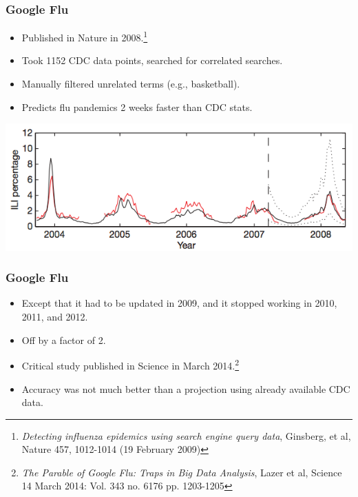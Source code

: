 \documentclass{beamer}
\begin{document}
\begin{frame}
\frametitle{Google Flu}
    \begin{itemize}
        \item Published in Nature in 2008.\footnote{
            \textit{Detecting influenza epidemics using search engine
            query data}, Ginsberg, et al, Nature 457, 1012-1014 (19 February
            2009)}
        \item<2-> Took 1152 CDC data points, searched for correlated searches.
        \item<3-> Manually filtered unrelated terms (e.g., basketball).
        \item<4-> Predicts flu pandemics 2 weeks faster than CDC stats.
    \end{itemize}
    \begin{center}
        \includegraphics[width=0.8\hsize]{art/googleflugraph}
    \end{center}
\end{frame}


\begin{frame}
    \frametitle{Google Flu}
    \begin{itemize}
        \item Except that it had to be updated in 2009, and it stopped working in 2010, 2011, and 2012.
        \item Off by a factor of 2.
        \item<2->Critical study published in Science in March 2014.\footnote{\textit{The Parable of Google 
            Flu: Traps in Big Data Analysis}, Lazer et al, Science 14 March
            2014: Vol. 343 no. 6176 pp. 1203-1205}
        \item<3->Accuracy was not much better than a projection using already available CDC data.
    \end{itemize}
\end{frame}

\end{document}
